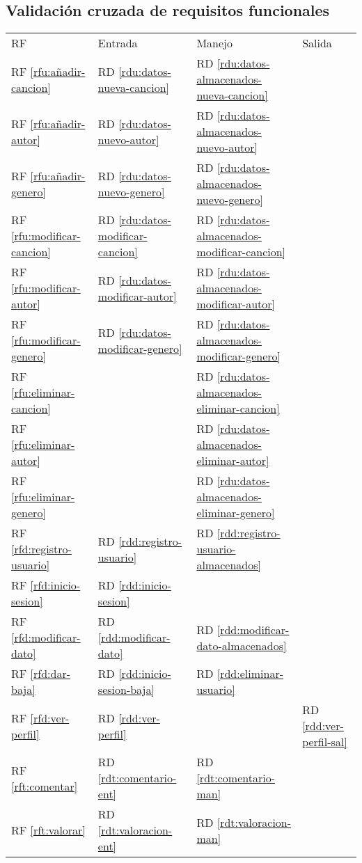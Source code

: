 \documentclass[
  12pt,
  a4paper,
  DIV=12,
  spanish,
]{scrartcl}
\newcounter{RF}
\newcounter{RD}
\begin{document}

\subsection{Validación cruzada de requisitos funcionales}
\begin{tabularx}{\linewidth}{l|XXX}
  RF & Entrada & Manejo & Salida \\
  RF \ref{rfu:añadir-cancion} & RD \ref{rdu:datos-nueva-cancion} & RD \ref{rdu:datos-almacenados-nueva-cancion} & \\
  RF \ref{rfu:añadir-autor} & RD \ref{rdu:datos-nuevo-autor} & RD \ref{rdu:datos-almacenados-nuevo-autor} & \\
  RF \ref{rfu:añadir-genero} & RD \ref{rdu:datos-nuevo-genero} & RD \ref{rdu:datos-almacenados-nuevo-genero}  & \\
  RF \ref{rfu:modificar-cancion} & RD \ref{rdu:datos-modificar-cancion} & RD \ref{rdu:datos-almacenados-modificar-cancion}  & \\
  RF \ref{rfu:modificar-autor} & RD \ref{rdu:datos-modificar-autor} & RD \ref{rdu:datos-almacenados-modificar-autor} & \\
  RF \ref{rfu:modificar-genero} & RD \ref{rdu:datos-modificar-genero} & RD \ref{rdu:datos-almacenados-modificar-genero}  & \\
  RF \ref{rfu:eliminar-cancion} & & RD \ref{rdu:datos-almacenados-eliminar-cancion}  & \\
  RF \ref{rfu:eliminar-autor} & & RD \ref{rdu:datos-almacenados-eliminar-autor} & \\
  RF \ref{rfu:eliminar-genero} &  & RD \ref{rdu:datos-almacenados-eliminar-genero}  & \\
  RF \ref{rfd:registro-usuario} & RD \ref{rdd:registro-usuario} & RD \ref{rdd:registro-usuario-almacenados} & \\
  RF \ref{rfd:inicio-sesion} & RD \ref{rdd:inicio-sesion} & & \\
  RF \ref{rfd:modificar-dato} &  RD \ref{rdd:modificar-dato} & RD \ref{rdd:modificar-dato-almacenados} & \\
  RF \ref{rfd:dar-baja} & RD \ref{rdd:inicio-sesion-baja} & RD \ref{rdd:eliminar-usuario} & \\
  RF \ref{rfd:ver-perfil} & RD \ref{rdd:ver-perfil} & & RD \ref{rdd:ver-perfil-sal} \\
  RF \ref{rft:comentar} & RD \ref{rdt:comentario-ent} & RD \ref{rdt:comentario-man} & \\
  RF \ref{rft:valorar} & RD \ref{rdt:valoracion-ent} & RD \ref{rdt:valoracion-man} & \\

\end{tabularx}
\end{document}
